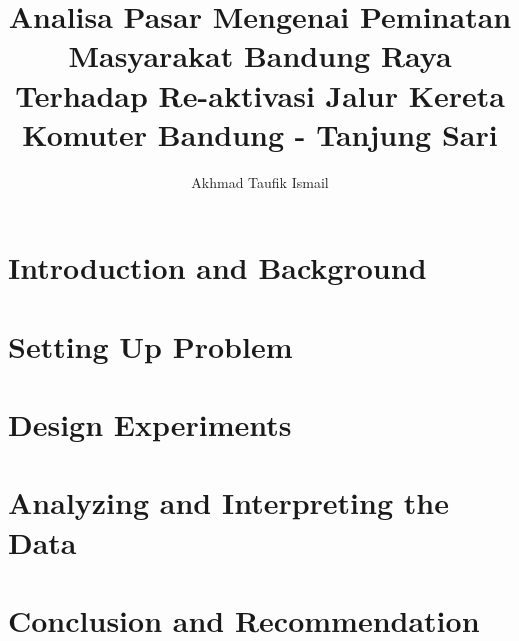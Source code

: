 \documentclass{article}
\begin{document}
\title{Analisa Pasar Mengenai Peminatan Masyarakat Bandung Raya Terhadap Re-aktivasi Jalur Kereta Komuter Bandung - Tanjung Sari}
\author{Akhmad Taufik Ismail}
\maketitle

\section{Introduction and Background} \par

\section{Setting Up Problem} \par

\section{Design Experiments} \par

\section{Analyzing and Interpreting the Data} \par

\section{Conclusion and Recommendation} \par

\printbibliography %
\end{document}
